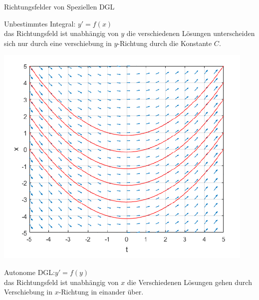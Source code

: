 \begin{definition}{Richtungsfelder von Speziellen DGL}\\
  \begin{minipage}{0.58\linewidth}
    Unbestimmtes Integral: \(y'=f(x)\)\\ das Richtungsfeld ist unabhängig von \(y\) die verschiedenen Lösungen
      unterscheiden sich nur durch eine verschiebung in \(y\)-Richtung durch die Konstante \(C\).
  \end{minipage}
  \begin{minipage}{0.4\linewidth}
    \begin{center}
      \includegraphics[width=1\linewidth]{images/UnbestimmtesIntegral.png}
      \end{center}
  \end{minipage}
  \begin{minipage}{0.58\linewidth}
    Autonome DGL:\(y'=f(y)\)\\ das Richtungsfeld ist unabhängig von \(x\) die Verschiedenen Lösungen gehen durch
    Verschiebung in \(x\)-Richtung in einander über.
  \end{minipage}
  \begin{minipage}{0.4\linewidth}
    \begin{center}

\end{center}
\end{minipage}
\end{definition}
